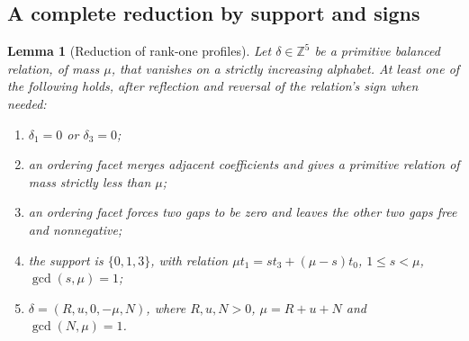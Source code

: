 \documentclass[11pt,reqno]{amsart}
\theoremstyle{plain}
\newtheorem{lemma}[theorem]{Lemma}
\theoremstyle{definition}
\theoremstyle{plain}
\newcommand{\Z}{\mathbb{Z}}
\theoremstyle{plain}
\theoremstyle{plain}
\theoremstyle{plain}
\theoremstyle{plain}
\theoremstyle{plain}
\theoremstyle{definition}
\theoremstyle{definition}
\theoremstyle{definition}
\theoremstyle{plain}
\begin{document}
\subsection{A complete reduction by support and signs}

\begin{lemma}[Reduction of rank-one profiles]\label{M-lem:rank-one-support}
Let $\delta\in\Z^5$ be a primitive balanced relation, of mass $\mu$, that
vanishes on a strictly increasing alphabet. At least one of the following
holds, after reflection and reversal of the relation's sign when needed:
\begin{enumerate}
\item $\delta_1=0$ or $\delta_3=0$;
\item an ordering facet merges adjacent coefficients and gives a primitive
      relation of mass strictly less than $\mu$;
\item an ordering facet forces two gaps to be zero and leaves the other
      two gaps free and nonnegative;
\item the support is $\{0,1,3\}$, with relation
      $\mu t_1=s t_3+(\mu-s)t_0$, $1\le s<\mu$, $\gcd(s,\mu)=1$;
\item $\delta=(R,u,0,-\mu,N)$, where $R,u,N>0$,
      $\mu=R+u+N$ and $\gcd(N,\mu)=1$.
\end{enumerate}
\end{lemma}
\end{document}
